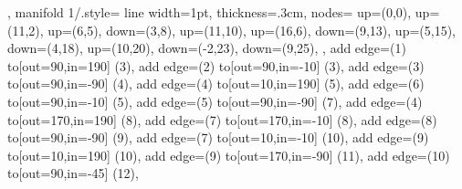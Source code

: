 {{},
manifold 1/.style={
line width=1pt, thickness=.3cm,
nodes={
		up={(0,0)},
		up={(11,2)},
		up={(6,5)},
		down={(3,8)},
		up={(11,10)},
		up={(16,6)},
		down={(9,13)},
		up={(5,15)},
		down={(4,18)},
		up={(10,20)},
		down={(-2,23)},
		down={(9,25)},
	},
	add edge={(1) to[out=90,in=190] (3)},
	add edge={(2) to[out=90,in=-10] (3)},
	add edge={(3) to[out=90,in=-90] (4)},
	add edge={(4) to[out=10,in=190] (5)},
	add edge={(6) to[out=90,in=-10] (5)},
	add edge={(5) to[out=90,in=-90] (7)},
	add edge={(4) to[out=170,in=190] (8)},
	add edge={(7) to[out=170,in=-10] (8)},
	add edge={(8) to[out=90,in=-90] (9)},
	add edge={(7) to[out=10,in=-10] (10)},
	add edge={(9) to[out=10,in=190] (10)},
	add edge={(9) to[out=170,in=-90] (11)},
	add edge={(10) to[out=90,in=-45] (12)},
}
}

\def\colorlist{"red","lime!80!green","violet","green","orange","cyan","green!80!blue!90!black","brown!90!black","yellow!70!orange","teal","pink","magenta","blue","olive"}
\newcommand{\getedgecolor}[2][\thiscolor]{\tikzmath{#1={\colorlist}[int(#2)-1];}}
